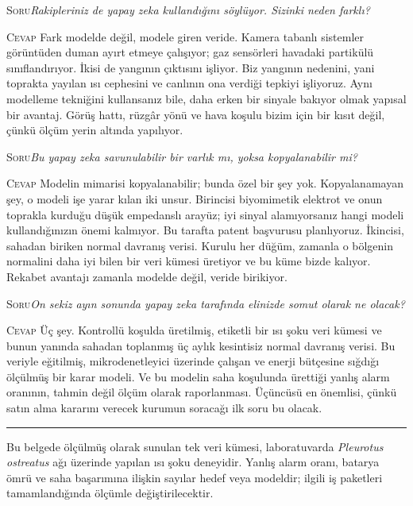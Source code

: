\documentclass[11pt,a4paper]{article}
\newcommand{\soru}[1]{%
  \par\vskip 15pt plus 4pt minus 2pt
  \noindent\textcolor{ember}{\textsc{Soru}}\quad\emph{#1}%
  \par\vskip 6pt\noindent\textcolor{myco}{\textsc{Cevap}}\quad\ignorespaces}
\begin{document}
\soru{Rakipleriniz de yapay zeka kullandığını söylüyor. Sizinki neden
farklı?}
Fark modelde değil, modele giren veride. Kamera tabanlı sistemler
görüntüden duman ayırt etmeye çalışıyor; gaz sensörleri havadaki
partikülü sınıflandırıyor. İkisi de yangının çıktısını işliyor. Biz
yangının nedenini, yani toprakta yayılan ısı cephesini ve canlının ona
verdiği tepkiyi işliyoruz. Aynı modelleme tekniğini kullansanız bile,
daha erken bir sinyale bakıyor olmak yapısal bir avantaj. Görüş hattı,
rüzgâr yönü ve hava koşulu bizim için bir kısıt değil, çünkü ölçüm
yerin altında yapılıyor.

\soru{Bu yapay zeka savunulabilir bir varlık mı, yoksa kopyalanabilir mi?}
Modelin mimarisi kopyalanabilir; bunda özel bir şey yok. Kopyalanamayan
şey, o modeli işe yarar kılan iki unsur. Birincisi biyomimetik elektrot
ve onun toprakla kurduğu düşük empedanslı arayüz; iyi sinyal
alamıyorsanız hangi modeli kullandığınızın önemi kalmıyor. Bu tarafta
patent başvurusu planlıyoruz. İkincisi, sahadan biriken normal davranış
verisi. Kurulu her düğüm, zamanla o bölgenin normalini daha iyi bilen
bir veri kümesi üretiyor ve bu küme bizde kalıyor. Rekabet avantajı
zamanla modelde değil, veride birikiyor.

\soru{On sekiz ayın sonunda yapay zeka tarafında elinizde somut olarak
ne olacak?}
Üç şey. Kontrollü koşulda üretilmiş, etiketli bir ısı şoku veri kümesi
ve bunun yanında sahadan toplanmış üç aylık kesintisiz normal davranış
verisi. Bu veriyle eğitilmiş, mikrodenetleyici üzerinde çalışan ve
enerji bütçesine sığdığı ölçülmüş bir karar modeli. Ve bu modelin saha
koşulunda ürettiği yanlış alarm oranının, tahmin değil ölçüm olarak
raporlanması. Üçüncüsü en önemlisi, çünkü satın alma kararını verecek
kurumun soracağı ilk soru bu olacak.

\vskip 18pt
\hrule
\vskip 8pt
\textcolor{muted}{\small Bu belgede ölçülmüş olarak sunulan tek veri
kümesi, laboratuvarda \emph{Pleurotus ostreatus} ağı üzerinde yapılan
ısı şoku deneyidir. Yanlış alarm oranı, batarya ömrü ve saha
başarımına ilişkin sayılar hedef veya modeldir; ilgili iş paketleri
tamamlandığında ölçümle değiştirilecektir.}
\end{document}
